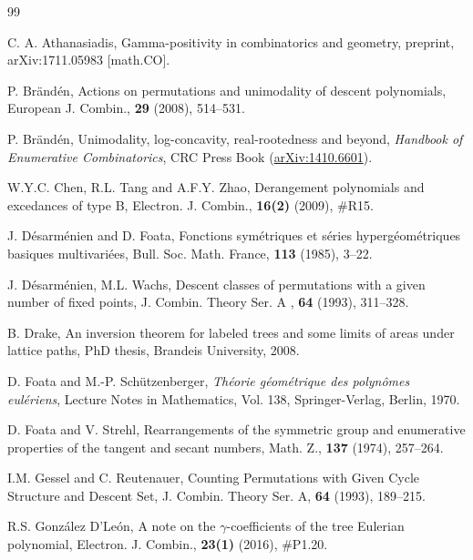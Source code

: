 \documentclass[12pt]{amsart}
\numberwithin{equation}{section}
\theoremstyle{plain}
\theoremstyle{definition}
\begin{document}
\begin{thebibliography}{99}



 C. A. Athanasiadis, Gamma-positivity in combinatorics and geometry,  	preprint, arXiv:1711.05983 [math.CO].

 P. Br\"and\'en, Actions on permutations and unimodality of descent polynomials, European J. Combin., {\bf29} (2008), 514--531. 

 P. Br\"and\'en, Unimodality, log-concavity, real-rootedness and beyond, {\em Handbook of Enumerative Combinatorics}, CRC Press Book (\href{http://arxiv.org/abs/1410.6601}{arXiv:1410.6601}).








W.Y.C. Chen, R.L. Tang and A.F.Y. Zhao, Derangement polynomials and excedances of type B, Electron. J. Combin., {\bf16(2)} (2009), \#R15.



 J. D\'esarm\'enien and  D. Foata,
 Fonctions sym\'etriques et s\'eries hyperg\'eom\'etriques basiques multivari\'ees,
 Bull. Soc. Math. France, {\bf113} (1985),  3--22.

 J. D\'esarm\'enien, M.L. Wachs, 
Descent classes of permutations with a given number of fixed points, 
J. Combin. Theory Ser. A , {\bf64} (1993), 311--328. 



 B. Drake, An inversion theorem for labeled trees and some limits of areas under lattice paths, PhD thesis, Brandeis University, 2008.

 D. Foata and M.-P. Sch\"utzenberger, {\em Th\'eorie g\'eom\'etrique des polyn\^omes eul\'eriens},  Lecture Notes in Mathematics, Vol. 138, Springer-Verlag, Berlin, 1970.

D. Foata and V. Strehl, Rearrangements of the symmetric group and enumerative properties of the tangent and secant numbers, Math. Z., {\bf137} (1974), 257--264.

 I.M. Gessel and C. Reutenauer, Counting Permutations with Given Cycle Structure and Descent Set, J. Combin. Theory Ser. A, {\bf64} (1993), 189--215. 

 R.S. Gonz\'alez D'Le\'on, A note on the $\gamma$-coefficients of the tree Eulerian polynomial, Electron. J. Combin., {\bf23(1)} (2016), \#P1.20.


\end{thebibliography}
\end{document}
